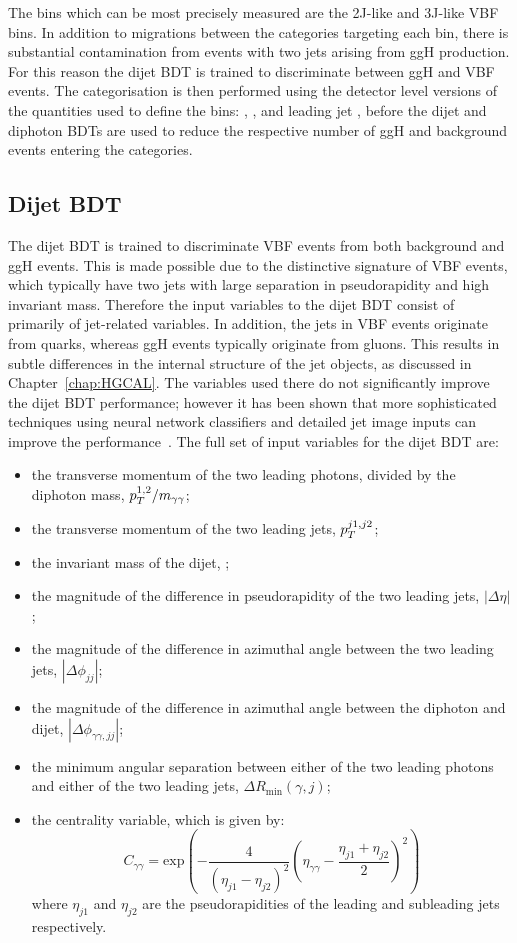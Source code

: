 The bins which can be most precisely measured are the 2J-like and 3J-like VBF bins.
In addition to migrations between the categories targeting each bin, 
there is substantial contamination from events with two jets arising from ggH production.
For this reason the dijet BDT is trained to discriminate between ggH and VBF events.
The categorisation is then performed using the detector level versions 
of the quantities used to define the bins: \mjj, \ptHjj, and leading jet \pt, 
before the dijet and diphoton BDTs are used 
to reduce the respective number of ggH and background events entering the categories.

\subsection{Dijet BDT}

The dijet BDT is trained to discriminate VBF events from both background and ggH events.
This is made possible due to the distinctive signature of VBF events, 
which typically have two jets with large separation in pseudorapidity and high invariant mass.
Therefore the input variables to the dijet BDT consist of primarily of jet-related variables.
In addition, the jets in VBF events originate from quarks, 
whereas ggH events typically originate from gluons.
This results in subtle differences in the internal structure of the jet objects, 
as discussed in Chapter~\ref{chap:HGCAL}.
The variables used there do not significantly improve the dijet BDT performance;
however it has been shown that more sophisticated techniques using neural network classifiers
and detailed jet image inputs can improve the performance~\cite{JackThesis}.
The full set of input variables for the dijet BDT are:
\begin{itemize}
\item the transverse momentum of the two leading photons, divided by the diphoton mass, $p_T^{1,2}/m_{\gamma\gamma}$;
\item the transverse momentum of the two leading jets, $p_T^{j1,j2}$;
\item the invariant mass of the dijet, \mjj;
\item the magnitude of the difference in pseudorapidity of the two leading jets, $|\Delta\eta|$;
\item the magnitude of the difference in azimuthal angle 
      between the two leading jets, $|\Delta\phi_{jj}|$;
\item the magnitude of the difference in azimuthal angle 
      between the diphoton and dijet, $|\Delta\phi_{\gamma\gamma,jj}|$;
\item the minimum angular separation between either of the two leading photons 
      and either of the two leading jets, $\Delta R_{\textrm{min}}(\gamma,j)$;
\item the centrality variable, which is given by:
\begin{equation}
C_{\gamma\gamma} = \mathrm{exp}\left(-\frac{4}{(\eta_{j1} - \eta_{j2})^{2}}\left( \eta_{\gamma\gamma} - \frac{\eta_{j1} + \eta_{j2}}{2} \right)^{2}\right)
\end{equation}
where $\eta_{j1}$ and $\eta_{j2}$ are the pseudorapidities of the 
leading and subleading jets respectively.
\end{itemize}

